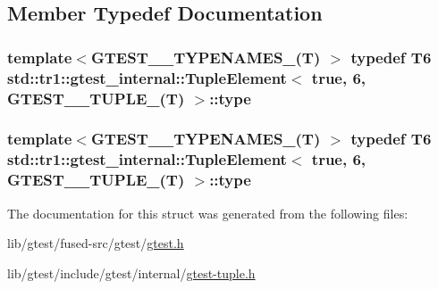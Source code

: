 \subsection{Member Typedef Documentation}
\hypertarget{structstd_1_1tr1_1_1gtest__internal_1_1_tuple_element_3_01true_00_016_00_01_g_t_e_s_t__10___t_u_p_l_e___07_t_08_01_4_a929a5e4d1a751f3d1a5780643f69a121}{
\subsubsection[{type}]{\setlength{\rightskip}{0pt plus 5cm}template$<$G\-T\-E\-S\-T\-\_\-\_\-\-T\-Y\-P\-E\-N\-A\-M\-E\-S\-\_\-(\-T) $>$ typedef T6 {\bf std\-::tr1\-::gtest\-\_\-internal\-::\-Tuple\-Element}$<$ true, 6, {\bf G\-T\-E\-S\-T\-\_\-\_\-\-T\-U\-P\-L\-E\-\_\-}(T) $>$\-::{\bf type}}}\label{structstd_1_1tr1_1_1gtest__internal_1_1_tuple_element_3_01true_00_016_00_01_g_t_e_s_t__10___t_u_p_l_e___07_t_08_01_4_a929a5e4d1a751f3d1a5780643f69a121}
\hypertarget{structstd_1_1tr1_1_1gtest__internal_1_1_tuple_element_3_01true_00_016_00_01_g_t_e_s_t__10___t_u_p_l_e___07_t_08_01_4_a929a5e4d1a751f3d1a5780643f69a121}{
\subsubsection[{type}]{\setlength{\rightskip}{0pt plus 5cm}template$<$G\-T\-E\-S\-T\-\_\-\_\-\-T\-Y\-P\-E\-N\-A\-M\-E\-S\-\_\-(\-T) $>$ typedef T6 {\bf std\-::tr1\-::gtest\-\_\-internal\-::\-Tuple\-Element}$<$ true, 6, {\bf G\-T\-E\-S\-T\-\_\-\_\-\-T\-U\-P\-L\-E\-\_\-}(T) $>$\-::{\bf type}}}\label{structstd_1_1tr1_1_1gtest__internal_1_1_tuple_element_3_01true_00_016_00_01_g_t_e_s_t__10___t_u_p_l_e___07_t_08_01_4_a929a5e4d1a751f3d1a5780643f69a121}


The documentation for this struct was generated from the following files\-:\begin{DoxyCompactItemize}
\item 
lib/gtest/fused-\/src/gtest/\hyperlink{fused-src_2gtest_2gtest_8h}{gtest.\-h}\item 
lib/gtest/include/gtest/internal/\hyperlink{gtest-tuple_8h}{gtest-\/tuple.\-h}\end{DoxyCompactItemize}
